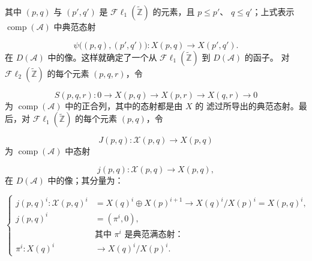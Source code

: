 \clearpage
{}%
\begingroup\small\setlength{\parskip}{0pt}\setlength{\emergencystretch}{1.5em}
\setlength{\abovedisplayskip}{4pt plus 2pt minus 2pt}%
\setlength{\belowdisplayskip}{4pt plus 2pt minus 2pt}%

\noindent 其中 $(p,q)$ 与 $(p',q')$ 是
$\mathcal{F}\ell_1(\widetilde{\mathbb Z})$ 的元素，且 $p\leq p'$、
$q\leq q'$；上式表示 $\operatorname{comp}(\mathcal A)$ 中典范态射

\begin{equation}
\psi\bigl((p,q),(p',q')\bigr)\colon
X(p,q)\longrightarrow X(p',q').
\tag{4.2.2.3}
\end{equation}
在 $D(\mathcal A)$ 中的像。这样就确定了一个从
$\mathcal{F}\ell_1(\widetilde{\mathbb Z})$ 到 $D(\mathcal A)$ 的函子。
对 $\mathcal{F}\ell_2(\widetilde{\mathbb Z})$ 的每个元素 $(p,q,r)$，令

\begin{equation}
S(p,q,r)\colon
0\longrightarrow X(p,q)\longrightarrow X(p,r)
\longrightarrow X(q,r)\longrightarrow0
\tag{4.2.2.4}
\end{equation}
为 $\operatorname{comp}(\mathcal A)$ 中的正合列，其中的态射都是由 $X$ 的
滤过所导出的典范态射。最后，对
$\mathcal{F}\ell_1(\widetilde{\mathbb Z})$ 的每个元素 $(p,q)$，令

\begin{equation}
J(p,q)\colon\mathcal X(p,q)\longrightarrow X(p,q)
\tag{4.2.2.5}
\end{equation}
为 $\operatorname{comp}(\mathcal A)$ 中态射

\begin{equation}
j(p,q)\colon\mathcal X(p,q)\longrightarrow X(p,q),
\tag{4.2.2.6}
\end{equation}
在 $D(\mathcal A)$ 中的像；其分量为：

\begin{equation}
\left\{
\begin{aligned}
j(p,q)^i\colon\mathcal X(p,q)^i
 &=X(q)^i\oplus X(p)^{i+1}
   \longrightarrow X(q)^i/X(p)^i=X(p,q)^i,\\
j(p,q)^i&=(\pi^i,0),\\
&\text{其中 $\pi^i$ 是典范满态射：}\\
\pi^i\colon X(q)^i&\longrightarrow X(q)^i/X(p)^i.
\end{aligned}
\right.
\tag{4.2.2.7}
\end{equation}


